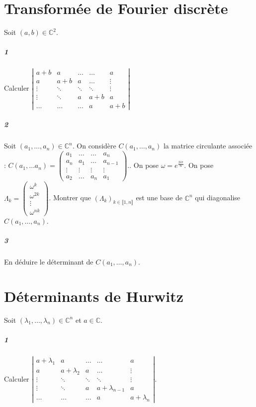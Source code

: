 \documentclass[10pt,a4paper]{article}
\begin{document}
\section{Transformée de Fourier discrète}
Soit $(a,b) \in \mathbb{C}^2$.
\subparagraph{1}Calculer $\left| \begin{matrix}
a+b & a & \dots & \dots & a \\ a & a+b & a & \dots & \vdots \\ 
\vdots & \ddots & \ddots & \ddots & \vdots 
\\
\vdots & \ddots & a & a+b & a\\
\dots & \dots & \dots & a & a+b
\end{matrix} \right|$
\subparagraph{2}Soit $(a_1, \dots,a_n) \in \mathbb{C}^n$. On considère $C(a_1,\dots,a_n)$ la matrice circulante associée : $C(a_1, \dots a_n) = \left( \begin{matrix}
a_1 & \dots & \dots & a_n \\
a_n & a_1 & \dots & a_{n-1} \\
\vdots & \vdots & \vdots & \vdots \\
a_2 & \dots & a_n & a_1
\end{matrix}\right).$. On pose $\omega = e^{\frac{2i \pi}{n}}$. On pose $\Lambda_k = \left( \begin{matrix}
\omega^k \\ \omega^{2k} \\ \vdots \\ \omega^{nk}
\end{matrix}\right)$. Montrer que $(\Lambda_k)_{k \in \llbracket 1,n \rrbracket}$ est une base de $\mathbb{C}^n$ qui diagonalise $C(a_1, \dots, a_n)$.
\subparagraph{3}En déduire le déterminant de $C(a_1,\dots,a_n)$.

\section{Déterminants de Hurwitz}
Soit $(\lambda_1, \dots, \lambda_n) \in \mathbb{C}^n$ et $a \in \mathbb{C}$.
\subparagraph{1}Calculer $\left| \begin{matrix}
a+\lambda_1 & a & \dots & \dots & a \\ a & a+\lambda_2 & a & \dots & \vdots \\ 
\vdots & \ddots & \ddots & \ddots & \vdots 
\\
\vdots & \ddots & a & a+\lambda_{n-1} & a\\
\dots & \dots & \dots & a & a+\lambda_n
\end{matrix} \right|$.
\end{document}
